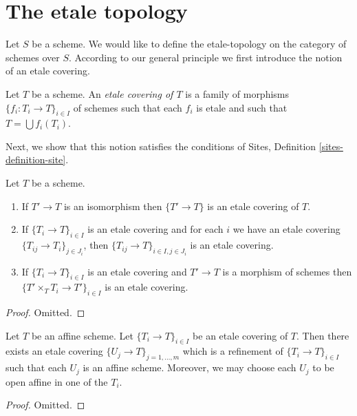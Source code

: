 \section{The etale topology}
\label{section-etale}

\noindent
Let $S$ be a scheme. We would like to define the etale-topology on
the category of schemes over $S$. According to our general principle
we first introduce the notion of an etale covering.

\begin{definition}
\label{definition-etale-covering}
Let $T$ be a scheme. An {\it etale covering of $T$} is a family
of morphisms $\{f_i : T_i \to T\}_{i \in I}$ of schemes
such that each $f_i$ is etale and such that $T = \bigcup f_i(T_i)$.
\end{definition}

\noindent
Next, we show that this notion satisfies the conditions of
Sites, Definition \ref{sites-definition-site}.

\begin{lemma}
\label{lemma-etale}
Let $T$ be a scheme.
\begin{enumerate}
\item If $T' \to T$ is an isomorphism then $\{T' \to T\}$
is an etale covering of $T$.
\item If $\{T_i \to T\}_{i\in I}$ is an etale covering and for each
$i$ we have an etale covering $\{T_{ij} \to T_i\}_{j\in J_i}$, then
$\{T_{ij} \to T\}_{i \in I, j\in J_i}$ is an etale covering.
\item If $\{T_i \to T\}_{i\in I}$ is an etale covering
and $T' \to T$ is a morphism of schemes then
$\{T' \times_T T_i \to T'\}_{i\in I}$ is an etale covering.
\end{enumerate}
\end{lemma}

\begin{proof}
Omitted.
\end{proof}

\begin{lemma}
\label{lemma-etale-affine}
Let $T$ be an affine scheme.
Let $\{T_i \to T\}_{i \in I}$ be an etale covering of $T$.
Then there exists an etale covering
$\{U_j \to T\}_{j = 1, \ldots, m}$ which is a refinement
of $\{T_i \to T\}_{i \in I}$ such that each $U_j$ is an affine
scheme. Moreover, we may choose each $U_j$ to be open affine
in one of the $T_i$.
\end{lemma}

\begin{proof}
Omitted.
\end{proof}

